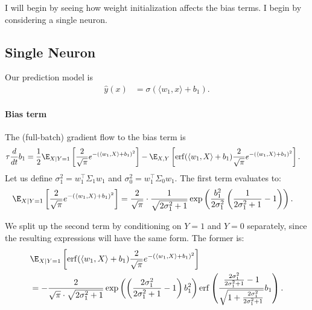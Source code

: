 \documentclass{article}
\begin{document}
I will begin by seeing how weight initialization affects the bias terms.
I begin by considering a single neuron.

\subsection*{Single Neuron}
Our prediction model is
\begin{align}
  \hat{y}(x) &= \sigma( \langle w_1, x \rangle + b_1 ).  
\end{align}

\paragraph*{Bias term}
The (full-batch) gradient flow to the bias term is
\begin{align}
  \tau \frac{d}{d t} b_1 
  &= \frac{1}{2} \E_{X \mid Y=1} \left[ \frac{2}{\sqrt{\pi}} e^{-( \langle w_1, X \rangle + b_1 )^2 } \right]
  - \E_{X,Y} \left[ \operatorname{erf}( \langle w_1, X \rangle + b_1 ) \frac{2}{\sqrt{\pi}} e^{-( \langle w_1, X \rangle + b_1 )^2 } \right].
\end{align}
Let us define $\sigma_{1}^2 = w_1^\top \Sigma_1 w_1$ and $\sigma_{0}^2 = w_1^\top \Sigma_0 w_1$.
The first term evaluates to:
\begin{align}
  \E_{X \mid Y=1} \left[ \frac{2}{\sqrt{\pi}} e^{-( \langle w_1, X \rangle + b_1 )^2 } \right] 
  &= \frac{2}{\sqrt{\pi}}\cdot\frac{1}{\sqrt{2\sigma_{1}^{2}+1}}\exp\left(\frac{b_{1}^{2}}{2\sigma_{1}^{2}}\left(\frac{1}{2\sigma_{1}^{2}+1}-1\right)\right).
\end{align}

We split up the second term by conditioning on $Y=1$ and $Y=0$ separately, since the resulting expressions will have the same form.
The former is:
\begin{align}
  &\E_{X \mid Y=1} \left[ \operatorname{erf}( \langle w_1, X \rangle + b_1 ) \frac{2}{\sqrt{\pi}} e^{-( \langle w_1, X \rangle + b_1 )^2 } \right] \\
  &= -\frac{2}{\sqrt{\pi}\cdot\sqrt{2\sigma_{1}^{2}+1}}\exp\left(\left(\frac{2\sigma_{1}^{2}}{2\sigma_{1}^{2}+1}-1\right)b_{1}^{2}\right)\operatorname{erf}\left(\frac{\frac{2\sigma_{1}^{2}}{2\sigma_{1}^{2}+1}-1}{\sqrt{1+\frac{2\sigma_{1}^{2}}{2\sigma_{1}^{2}+1}}}b_{1}\right).
\end{align}
\end{document}
